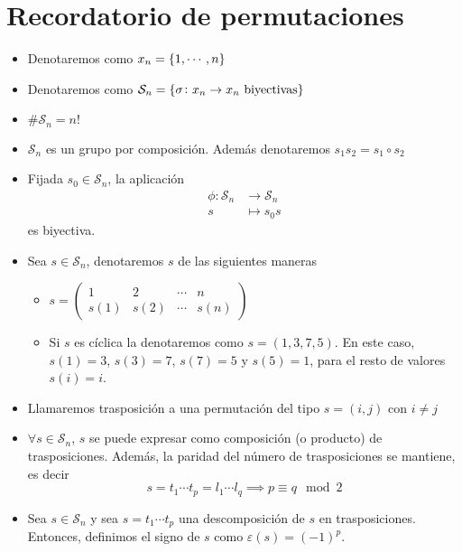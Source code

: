 \section{Recordatorio de permutaciones}

\begin{itemize}
    \item Denotaremos como $x_n = \left\{1, \cdots, n\right\}$
    \item Denotaremos como $\mathcal{S}_n =\left\{\sigma\colon x_n \to
        x_n \text{ biyectivas}\right\}$
    \item $\#\mathcal{S}_n= n!$
    \item $\mathcal{S}_n$ es un grupo por composición. Además denotaremos
        $s_1 s_2 = s_1 \circ s_2$
    \item\label{obs:perm_biy} Fijada $s_0 \in \mathcal{S}_n$, la aplicación
        \[
            \begin{aligned}
                \phi \colon \mathcal{S}_n &\to \mathcal{S}_n \\
                s &\mapsto s_0s
            \end{aligned}
        \]
        es biyectiva.
    \item Sea $s \in \mathcal{S}_n$, denotaremos $s$  de las siguientes maneras
        \begin{itemize}
            \item $s = \begin{pmatrix}
                1 & 2 & \cdots & n \\
                s(1) & s(2) & \cdots & s(n)
            \end{pmatrix}$
            \item Si $s$ es cíclica la denotaremos como $s = (1,3,7,5)$. En este
            caso, $s(1)=3$, $s(3)=7$, $s(7)=5$ y $s(5)=1$, para el resto de valores
            $s(i)=i$.
        \end{itemize}
    \item Llamaremos trasposición a una permutación del tipo $s=(i,j)$ con
        $i \neq j$
    \item $\forall s \in \mathcal{S}_n$, $s$ se puede expresar como composición
        (o producto) de trasposiciones. Además, la paridad del número de
        trasposiciones se mantiene, es decir
        \[
            s = t_1 \cdots t_p = l_1 \cdots l_q \implies p \equiv q \mod 2
        \]
    \item Sea $s \in \mathcal{S}_n$ y sea $s=t_1 \cdots t_p$ una descomposición de
        $s$ en trasposiciones. Entonces, definimos el signo de $s$ como
        $\varepsilon(s) = (-1)^p$.
\end{itemize}

